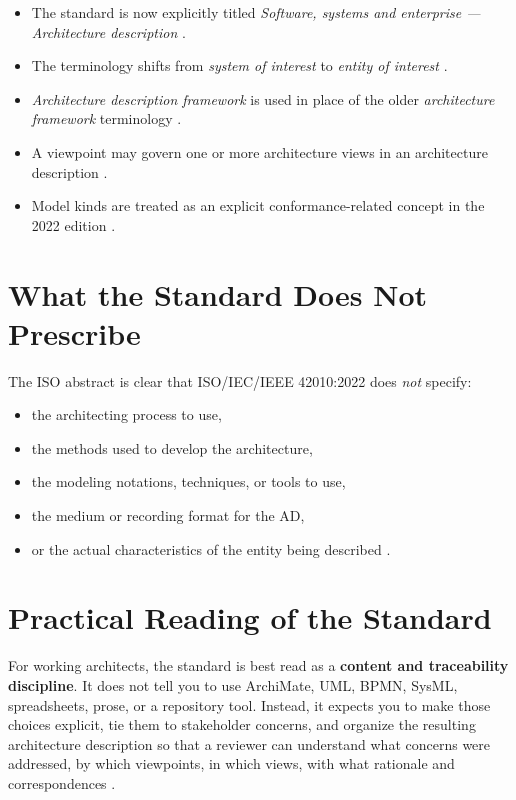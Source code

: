 \documentclass[11pt]{article}
\begin{document}
\begin{itemize}
    \item The standard is now explicitly titled \emph{Software, systems and enterprise --- Architecture description} \cite{iso42010}.
    \item The terminology shifts from \emph{system of interest} to \emph{entity of interest} \cite{nora42010}.
    \item \emph{Architecture description framework} is used in place of the older \emph{architecture framework} terminology \cite{nora42010}.
    \item A viewpoint may govern one or more architecture views in an architecture description \cite{nora42010}.
    \item Model kinds are treated as an explicit conformance-related concept in the 2022 edition \cite{iso42010,nora42010}.
\end{itemize}

\section*{What the Standard Does Not Prescribe}
The ISO abstract is clear that ISO/IEC/IEEE 42010:2022 does \emph{not} specify:
\begin{itemize}
    \item the architecting process to use,
    \item the methods used to develop the architecture,
    \item the modeling notations, techniques, or tools to use,
    \item the medium or recording format for the AD,
    \item or the actual characteristics of the entity being described \cite{iso42010}.
\end{itemize}

\section*{Practical Reading of the Standard}
For working architects, the standard is best read as a \textbf{content and traceability discipline}. It does not tell you to use ArchiMate, UML, BPMN, SysML, spreadsheets, prose, or a repository tool. Instead, it expects you to make those choices explicit, tie them to stakeholder concerns, and organize the resulting architecture description so that a reviewer can understand what concerns were addressed, by which viewpoints, in which views, with what rationale and correspondences \cite{iso42010,cm42010}.
\end{document}
